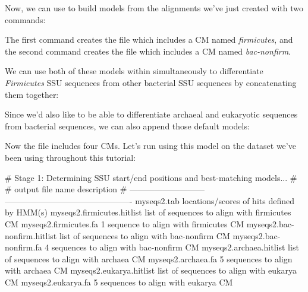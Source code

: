 Now, we can use  to build models from the alignments
we've just created with two commands:



The first command creates the file  which includes a CM
named \emph{firmicutes}, and the second command creates the file
 which includes a CM named
\emph{bac-nonfirm}. 

We can use both of these models within  simultaneously
to differentiate \emph{Firmicutes} SSU sequences from other bacterial
SSU sequences by concatenating them together:


Since we'd also like to be able to differentiate archaeal and
eukaryotic sequences from bacterial sequences, we can also append
those default models:


Now the file  includes four CMs. Let's run
 using this model on the  dataset
we've been using throughout this tutorial:


\begin{sreoutput}
# Stage 1: Determining SSU start/end positions and best-matching models...
#
# output file name             description                                        
# ---------------------------  ----------------------------------------------
  myseqs2.tab                  locations/scores of hits defined by HMM(s)
  myseqs2.firmicutes.hitlist   list of sequences to align with firmicutes CM
  myseqs2.firmicutes.fa              1 sequence  to align with firmicutes CM
  myseqs2.bac-nonfirm.hitlist  list of sequences to align with bac-nonfirm CM
  myseqs2.bac-nonfirm.fa             4 sequences to align with bac-nonfirm CM
  myseqs2.archaea.hitlist      list of sequences to align with archaea CM
  myseqs2.archaea.fa                 5 sequences to align with archaea CM
  myseqs2.eukarya.hitlist      list of sequences to align with eukarya CM
  myseqs2.eukarya.fa                 5 sequences to align with eukarya CM
\end{sreoutput}

